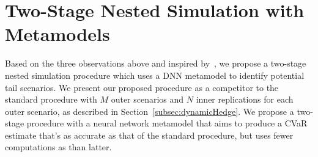 \section{Two-Stage Nested Simulation with Metamodels} \label{sec2:metamodel2Stage}

Based on the three observations above and inspired by~\cite{dang2020efficient}, we propose a two-stage nested simulation procedure which uses a DNN metamodel to identify potential tail scenarios.
We present our proposed procedure as a competitor to the standard procedure with $M$ outer scenarios and $N$ inner replications for each outer scenario, as described in Section~\ref{subsec:dynamicHedge}.
We propose a two-stage procedure with a neural network metamodel that aims to produce a CVaR estimate that's as accurate as that of the standard procedure, but uses fewer computations as than latter.

